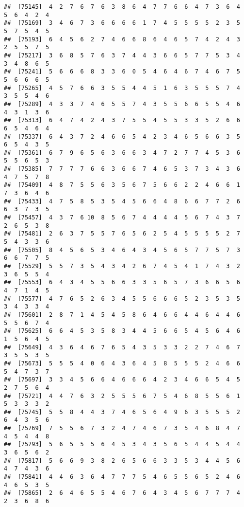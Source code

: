 \documentclass[
]{book}
\begin{document}
\begin{verbatim}
##  [75145]  4  2  7  6  7  6  3  8  6  4  7  7  6  6  4  7  3  6  4  5  6  4  2  4
##  [75169]  3  4  6  7  3  6  6  6  6  1  7  4  5  5  5  5  2  3  5  5  7  5  4  5
##  [75193]  6  4  5  6  2  7  4  6  6  8  6  4  6  5  7  4  2  4  3  2  5  5  7  5
##  [75217]  3  6  8  5  7  6  3  7  4  4  3  6  6  5  7  7  5  3  4  3  4  8  6  5
##  [75241]  5  6  6  6  8  3  3  6  0  5  4  6  4  6  7  4  6  7  5  5  6  6  6  5
##  [75265]  4  5  7  6  6  3  5  5  4  4  5  1  6  3  5  5  5  7  4  3  5  5  4  6
##  [75289]  4  3  3  7  4  6  5  5  7  4  3  5  5  6  6  5  5  4  6  4  3  1  3  6
##  [75313]  6  4  7  4  2  4  3  7  5  5  4  5  5  3  3  5  2  6  6  6  5  4  6  4
##  [75337]  6  4  3  7  2  4  6  6  5  4  2  3  4  6  5  6  6  3  5  6  5  4  3  5
##  [75361]  6  7  9  6  5  6  3  6  6  3  4  7  2  7  7  4  5  3  6  5  5  6  5  3
##  [75385]  7  7  7  7  6  6  3  6  6  7  4  6  5  3  7  3  4  3  6  4  7  5  7  8
##  [75409]  4  8  7  5  5  6  3  5  6  7  5  6  6  2  2  4  6  6  1  7  3  6  4  6
##  [75433]  4  7  5  8  5  3  5  4  5  6  6  4  8  6  6  7  7  2  6  6  3  7  3  5
##  [75457]  4  3  7  6 10  8  5  6  7  4  4  4  4  5  6  7  4  3  7  2  6  5  3  8
##  [75481]  2  6  3  7  5  5  7  6  5  6  2  5  4  5  5  5  5  2  7  5  4  3  3  6
##  [75505]  8  4  5  6  5  3  4  6  4  3  4  5  6  5  7  7  5  7  3  6  6  7  7  5
##  [75529]  5  5  7  3  5  4  3  4  2  6  7  4  5  4  1  7  4  3  2  3  6  5  5  4
##  [75553]  6  4  3  4  5  5  6  6  3  3  5  6  5  7  3  6  6  5  6  4  7  1  4  5
##  [75577]  4  7  6  5  2  6  3  4  5  5  6  6  6  5  2  3  5  3  5  3  4  3  3  4
##  [75601]  2  8  7  1  4  5  4  5  8  6  4  6  6  4  4  6  4  4  6  5  5  6  7  4
##  [75625]  6  6  4  5  3  5  8  3  4  4  5  6  6  5  4  5  6  4  6  1  5  6  4  5
##  [75649]  4  3  6  4  6  7  6  5  4  3  5  3  3  2  2  7  4  6  7  3  5  5  3  5
##  [75673]  5  5  5  4  0  6  4  3  6  4  5  8  5  5  5  2  4  6  6  5  4  7  3  7
##  [75697]  3  3  4  5  6  6  4  6  6  6  4  2  3  4  6  6  5  4  5  2  7  5  6  4
##  [75721]  4  4  7  6  3  2  5  5  5  6  7  5  4  6  8  5  5  6  1  5  3  3  3  2
##  [75745]  5  5  8  4  4  3  7  4  6  5  6  4  9  6  3  5  5  5  2  6  4  3  5  6
##  [75769]  7  5  5  6  7  3  2  4  7  4  6  7  3  5  4  6  8  4  7  4  5  4  4  8
##  [75793]  5  6  5  5  5  6  4  5  3  4  3  5  6  5  4  4  5  4  4  3  6  5  6  2
##  [75817]  5  6  6  9  3  8  2  6  5  6  6  3  3  5  3  4  4  5  6  4  7  4  3  6
##  [75841]  4  4  6  3  6  4  7  7  7  5  4  6  5  5  6  5  2  4  6  4  6  5  3  5
##  [75865]  2  6  4  6  5  5  4  6  7  6  4  3  4  5  6  7  7  7  4  2  3  6  8  6

\end{verbatim}
\end{document}
